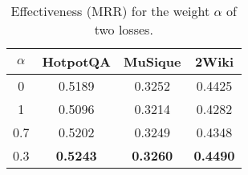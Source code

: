 \begin{table}[]
    \centering
    \caption{Effectiveness (MRR) for the weight $\alpha$ of two losses.}
    \label{tab:loss_weight}
    \begin{tabular}{@{}c|ccc@{}}
        \toprule
        $\alpha$ & HotpotQA        & MuSique         & 2Wiki           \\ \midrule
        0        & 0.5189          & 0.3252          & 0.4425          \\
        1        & 0.5096          & 0.3214          & 0.4282          \\
        0.7      & 0.5202          & 0.3249          & 0.4348          \\
        0.3      & \textbf{0.5243} & \textbf{0.3260} & \textbf{0.4490} \\ \bottomrule
        \end{tabular}%
    \end{table}
